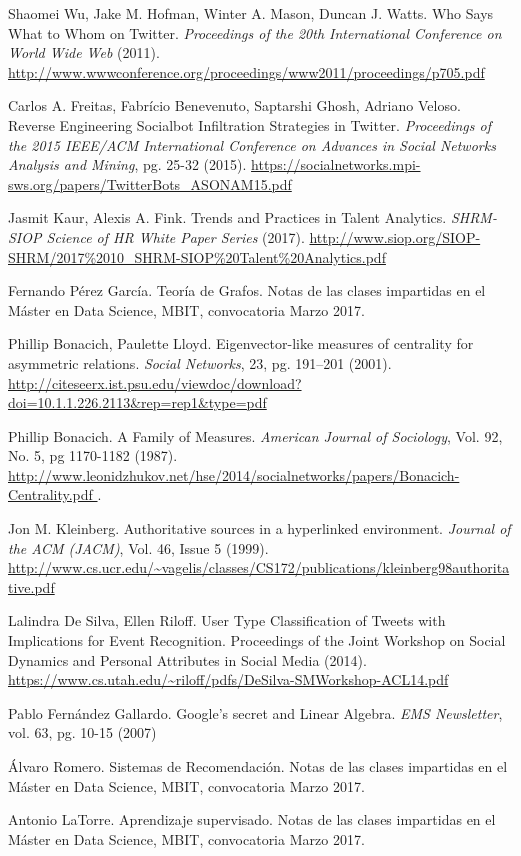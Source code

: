 \begin{thebibliography}{3}
 Shaomei Wu, Jake M. Hofman, Winter A. Mason, Duncan J. Watts.  
Who Says What to Whom on Twitter.
{\em  Proceedings of the 20th International Conference on World Wide Web} (2011).
\url{ http://www.wwwconference.org/proceedings/www2011/proceedings/p705.pdf }

 Carlos A. Freitas, Fabrício Benevenuto, Saptarshi Ghosh, Adriano Veloso.
Reverse Engineering Socialbot Infiltration Strategies in Twitter.
{\em Proceedings of the 2015 IEEE/ACM International Conference on Advances in Social Networks Analysis and Mining}, pg. 25-32 (2015).
\url{https://socialnetworks.mpi-sws.org/papers/TwitterBots_ASONAM15.pdf }

 Jasmit Kaur, Alexis A. Fink. Trends and Practices in Talent
Analytics. {\em SHRM-SIOP Science of HR White Paper Series} (2017).
\url{http://www.siop.org/SIOP-SHRM/2017%2010_SHRM-SIOP%20Talent%20Analytics.pdf }

 Fernando Pérez García. Teoría de Grafos. Notas de las clases
impartidas en el Máster en Data Science, MBIT, convocatoria Marzo 2017.

 Phillip Bonacich, Paulette Lloyd. 
Eigenvector-like measures of centrality for asymmetric relations.
{\em Social Networks}, 23, pg. 191–201 (2001).
\url{http://citeseerx.ist.psu.edu/viewdoc/download?doi=10.1.1.226.2113&rep=rep1&type=pdf }

 Phillip Bonacich. A Family of Measures. {\em American Journal 
of Sociology}, Vol. 92, No. 5, pg 1170-1182 (1987). 
\url{http://www.leonidzhukov.net/hse/2014/socialnetworks/papers/Bonacich-Centrality.pdf }.

Jon M. Kleinberg. Authoritative sources in a hyperlinked environment.
{\em Journal of the ACM (JACM)}, Vol. 46, Issue 5 (1999).
\url{http://www.cs.ucr.edu/~vagelis/classes/CS172/publications/kleinberg98authoritative.pdf } 


 Lalindra De Silva, Ellen Riloff. User Type Classification of Tweets with Implications 
for Event Recognition. Proceedings of the Joint Workshop on Social Dynamics and Personal Attributes 
in Social Media (2014).
\url{https://www.cs.utah.edu/~riloff/pdfs/DeSilva-SMWorkshop-ACL14.pdf }

 Pablo Fernández Gallardo. Google’s secret and Linear Algebra.
 {\em EMS Newsletter}, vol. 63, pg. 10-15 (2007)

 Álvaro Romero. Sistemas de Recomendación. Notas de las clases
impartidas en el Máster en Data Science, MBIT, convocatoria Marzo 2017.

 Antonio LaTorre. Aprendizaje supervisado. Notas de las clases
impartidas en el Máster en Data Science, MBIT, convocatoria Marzo 2017.
\end{thebibliography}